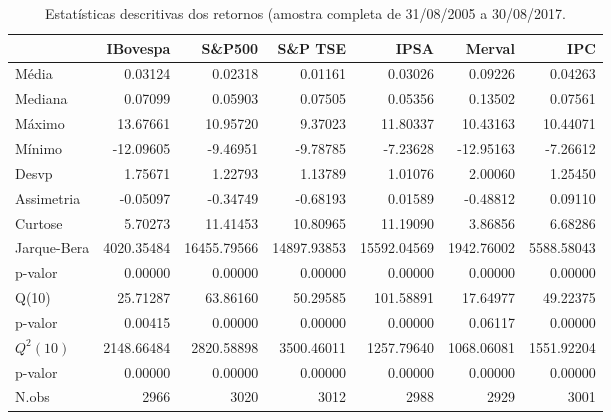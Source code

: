 \begin{table}[H]
\centering
\caption{Estatísticas descritivas dos retornos 
               (amostra completa de 31/08/2005 a 30/08/2017.} 
\label{tab:descritivas}
\begin{tabular}{lrrrrrr}
  \hline
 & IBovespa & S\&P500 & S\&P TSE & IPSA & Merval & IPC \\ 
  \hline
Média & 0.03124 & 0.02318 & 0.01161 & 0.03026 & 0.09226 & 0.04263 \\ 
  Mediana & 0.07099 & 0.05903 & 0.07505 & 0.05356 & 0.13502 & 0.07561 \\ 
  Máximo & 13.67661 & 10.95720 & 9.37023 & 11.80337 & 10.43163 & 10.44071 \\ 
  Mínimo & -12.09605 & -9.46951 & -9.78785 & -7.23628 & -12.95163 & -7.26612 \\ 
  Desvp & 1.75671 & 1.22793 & 1.13789 & 1.01076 & 2.00060 & 1.25450 \\ 
  Assimetria & -0.05097 & -0.34749 & -0.68193 & 0.01589 & -0.48812 & 0.09110 \\ 
  Curtose & 5.70273 & 11.41453 & 10.80965 & 11.19090 & 3.86856 & 6.68286 \\ 
  Jarque-Bera & 4020.35484 & 16455.79566 & 14897.93853 & 15592.04569 & 1942.76002 & 5588.58043 \\ 
  p-valor & 0.00000 & 0.00000 & 0.00000 & 0.00000 & 0.00000 & 0.00000 \\ 
  Q(10) & 25.71287 & 63.86160 & 50.29585 & 101.58891 & 17.64977 & 49.22375 \\ 
  p-valor & 0.00415 & 0.00000 & 0.00000 & 0.00000 & 0.06117 & 0.00000 \\ 
  $Q^2(10)$ & 2148.66484 & 2820.58898 & 3500.46011 & 1257.79640 & 1068.06081 & 1551.92204 \\ 
  p-valor & 0.00000 & 0.00000 & 0.00000 & 0.00000 & 0.00000 & 0.00000 \\ 
  N.obs & 2966 & 3020 & 3012 & 2988 & 2929 & 3001 \\ 
   \hline
\end{tabular}
\end{table}
